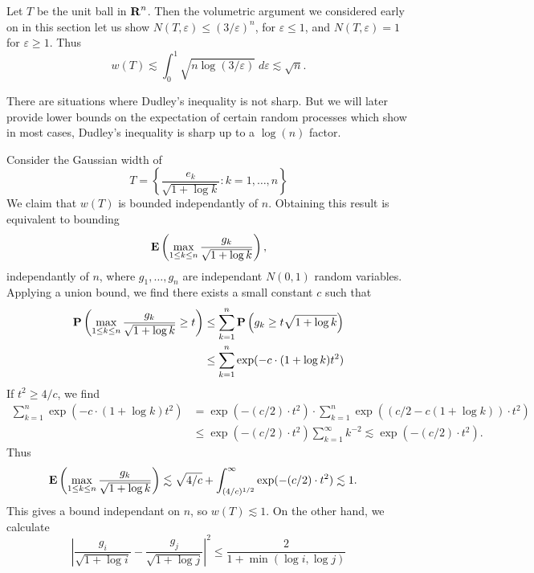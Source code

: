 \begin{example}
	Let $T$ be the unit ball in $\operatorname{\mathbf{R}}^n$. Then the volumetric argument we considered early on in this section let us show $N(T,\varepsilon) \leq (3/\varepsilon)^n$, for $\varepsilon \leq 1$, and $N(T,\varepsilon) = 1$ for $\varepsilon \geq 1$. Thus
	\[ w(T) \lesssim \int_0^1 \sqrt{n \log(3/\varepsilon)}\; d\varepsilon \lesssim \sqrt{n}. \]
\end{example}

There are situations where Dudley's inequality is not sharp. But we will later provide lower bounds on the expectation of certain random processes which show in most cases, Dudley's inequality is sharp up to a $\log(n)$ factor.

\begin{example}
	Consider the Gaussian width of
	\[ T = \left\{ \frac{e_k}{\sqrt{1 + \log k}} : k = 1, \dots, n \right\} \]
	We claim that $w(T)$ is bounded independantly of $n$. Obtaining this result is equivalent to bounding
	\[ \operatorname{\mathbf{E}} \left(\max_{1 \leq k \leq n} \frac{g_k}{\sqrt{1 + \log k}} \right), \]
	independantly of $n$, where $g_1, \dots, g_n$ are independant $N(0,1)$ random variables. Applying a union bound, we find there exists a small constant $c$ such that
	\begin{align*}
		\operatorname{\mathbf{P}} \left(\max_{1 \leq k \leq n} \frac{g_k}{\sqrt{1 + \log k}} \geq t \right) &\leq \sum_{k = 1}^n \operatorname{\mathbf{P}} \left(g_k \geq t \sqrt{1 + \log k} \right)\\
		&\leq \sum_{k = 1}^n \exp(-c \cdot (1 + \log k)t^2)\\
	\end{align*}
	If $t^2 \geq 4/c$, we find
	\begin{align*}
		\sum_{k = 1}^n \exp(-c \cdot (1 + \log k) t^2) &= \exp(-(c/2) \cdot t^2) \cdot \sum_{k = 1}^n \exp((c/2 - c (1 + \log k)) \cdot t^2)\\
		&\leq \exp(- (c/2) \cdot t^2) \sum_{k = 1}^\infty k^{-2} \lesssim \exp(-(c/2) \cdot t^2).
	\end{align*}
	Thus
	\begin{align*}
		\operatorname{\mathbf{E}} \left( \max_{1 \leq k \leq n} \frac{g_k}{\sqrt{1 + \log k}} \right) &\lesssim \sqrt{4/c} + \int_{(4/c)^{1/2}}^\infty \exp(-(c/2) \cdot t^2) \lesssim 1.
	\end{align*}
	This gives a bound independant on $n$, so $w(T) \lesssim 1$. On the other hand, we calculate
	\[ \left| \frac{g_i}{\sqrt{1 + \log i}} - \frac{g_j}{\sqrt{1 + \log j}} \right|^2 \leq \frac{2}{1 + \min(\log i, \log j)} \]

\end{example}
